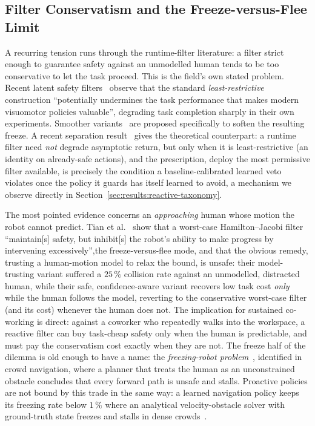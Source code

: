 \documentclass[11pt,a4paper]{report}
\begin{document}
\subsection{Filter Conservatism and the Freeze-versus-Flee Limit}
\label{sec:bg:cbf:conservatism}

A recurring tension runs through the runtime-filter literature: a
filter strict enough to guarantee safety against an unmodelled human
tends to be too conservative to let the task proceed. This is the
field's own stated problem. Recent latent safety
filters~\cite{nakamura2025latent} observe that the standard
\emph{least-restrictive} construction ``potentially undermines the
task performance that makes modern visuomotor policies valuable'',
degrading task completion sharply in their own experiments. Smoother
variants~\cite{latentcbf2025} are proposed specifically to soften
the resulting freeze. A recent separation
result~\cite{permissivefilter2025} gives the theoretical
counterpart: a runtime filter need \emph{not} degrade asymptotic
return, but only when it is least-restrictive (an identity on
already-safe actions), and the prescription, deploy the most
permissive filter available, is precisely the condition a
baseline-calibrated learned veto violates once the policy it guards
has itself learned to avoid, a mechanism we observe directly in
Section~\ref{sec:results:reactive-taxonomy}.

The most pointed evidence concerns an \emph{approaching} human whose
motion the robot cannot predict. Tian et al.~\cite{tian2022confidence}
show that a worst-case Hamilton--Jacobi filter ``maintain[s] safety, but
inhibit[s] the robot's ability to make progress by intervening
excessively'',the freeze-versus-flee mode, and that the obvious
remedy, trusting a human-motion model to relax the bound, is unsafe:
their model-trusting variant suffered a $25\,\%$ collision rate against
an unmodelled, distracted human, while their safe, confidence-aware
variant recovers low task cost \emph{only} while the human follows the
model, reverting to the conservative worst-case filter (and its
cost) whenever the human does not. The implication for sustained
co-working is direct: against a coworker who repeatedly walks into the
workspace, a reactive filter can buy task-cheap safety only when the
human is predictable, and must pay the conservatism cost exactly when
they are not. The freeze half of the dilemma is old enough to have a
name: the \emph{freezing-robot problem}~\cite{trautman2010freezing},
identified in crowd navigation, where a planner that treats the human
as an unconstrained obstacle concludes that every forward path is
unsafe and stalls. Proactive policies are not bound by this trade in
the same way: a learned navigation policy keeps its freezing rate
below $1\,\%$ where an analytical velocity-obstacle solver with
ground-truth state freezes and stalls in dense
crowds~\cite{dontfreeze2026}.
\end{document}
